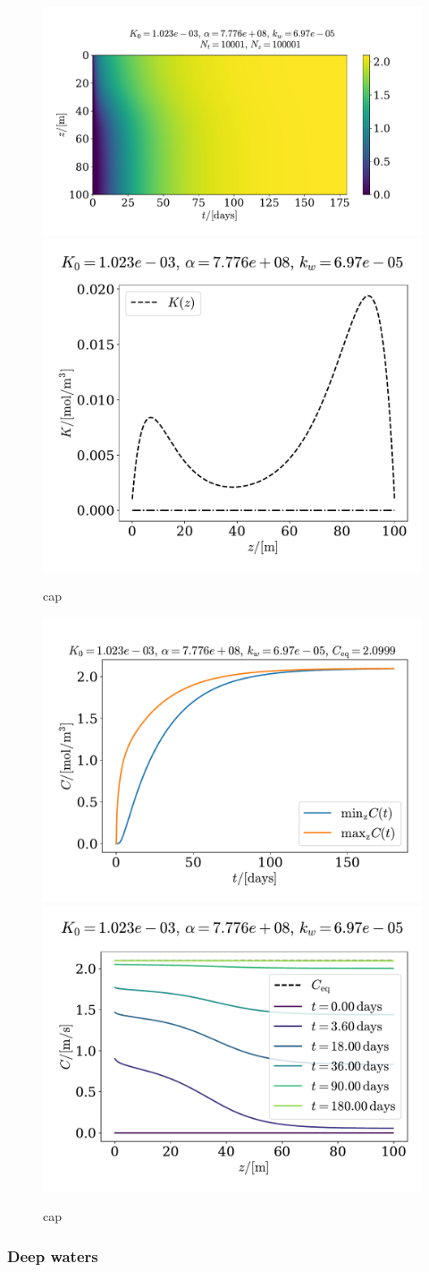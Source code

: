\documentclass{article}
\begin{document}
    \begin{figure}[h]
        \centering
        \includegraphics[width=.65\textwidth]{../plots/prob2}
        \includegraphics[width=.3\textwidth]{../plots/prob2_K}
        \caption{cap}
        \label{prob2}
    \end{figure}

    \begin{figure}[h]
        \centering
        \includegraphics[width=.47\textwidth]{../plots/prob2_minmax}
        \includegraphics[width=.52\textwidth]{../plots/prob2_i}
        \caption{cap}
        \label{prob2 minmax}
    \end{figure}

    \subsubsection*{Deep waters}
    


    
    
\end{document}
